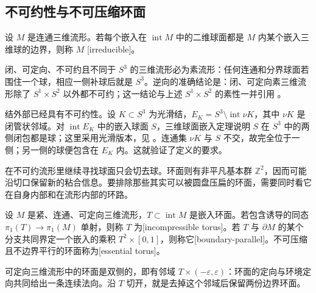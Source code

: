 \subsection{不可约性与不可压缩环面}
\label{g2:subsec:A04:02}

\begin{definition}\label{g2:def:irreducible-three-manifold}
	设 \(M\) 是连通三维流形。若每个嵌入在 \(\operatorname{int}M\) 中的二维球面都是 \(M\) 内某个嵌入三维球的边界，则称 \(M\) [irreducible]。
\end{definition}

闭、可定向、不可约且不同于 \(S^3\) 的三维流形必为素流形：任何连通和分界球面若围住一个球，相应一侧补球后就是 \(S^3\)。逆向的准确结论是：闭、可定向素三维流形除了 \(S^1\times S^2\) 以外都不可约；这一结论与上述 \(S^1\times S^2\) 的素性一并引用 \cite[第1.2节]{AschenbrennerFriedlWilton2015}。

\ProseParagraphBreak

结外部已经具有不可约性。设 \(K\subset S^3\) 为光滑结，\(E_K=S^3\setminus\operatorname{int}\nu K\)，其中 \(\nu K\) 是闭管状邻域。对 \(\operatorname{int}E_K\) 中的嵌入球面 \(S\)，三维球面嵌入定理说明 \(S\) 在 \(S^3\) 中的两侧闭包都是球；这里采用光滑版本，见 \cite[序言，第vi页]{Lickorish1997KnotTheory}。连通集 \(\nu K\) 与 \(S\) 不交，故完全位于一侧；另一侧的球便包含在 \(E_K\) 内。这就验证了定义的要求。

\ProseParagraphBreak

在不可约流形里继续寻找球面只会切去球。环面则有非平凡基本群 \(\mathbb Z^2\)，因而可能沿切口保留新的粘合信息。要排除那些其实可以被圆盘压扁的环面，需要同时看它在自身内部和在流形内部的环路。

\begin{definition}\label{g2:def:incompressible-torus}
	设 \(M\) 是紧、连通、可定向三维流形，\(T\subset\operatorname{int}M\) 是嵌入环面。若包含诱导的同态 \(\pi_1(T)\to\pi_1(M)\) 单射，则称 \(T\) 为[incompressible torus]。若 \(T\) 与 \(\partial M\) 的某个分支共同界定一个嵌入的乘积 \(T^2\times[0,1]\)，则称它[boundary-parallel]。不可压缩且不边界平行的环面称为[essential torus]。
\end{definition}

可定向三维流形中的环面是双侧的，即有邻域 \(T\times(-\varepsilon,\varepsilon)\)：环面的定向与环境定向共同给出一条连续法向。沿 \(T\) 切开，就是去掉这个邻域后保留两份边界环面。

\ProseParagraphBreak

